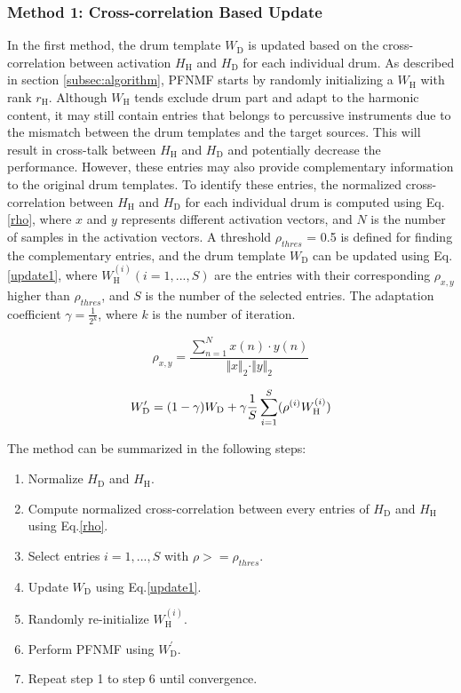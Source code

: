\documentclass{article}
\begin{document}
\subsubsection{Method 1: Cross-correlation Based Update}\label{subsubsec:method1}
In the first method, the drum template $W_\mathrm{D}$ is updated based on the cross-correlation between activation $H_\mathrm{H}$ and $H_\mathrm{D}$ for each individual drum. As described in section \ref{subsec:algorithm}, PFNMF starts by randomly initializing a $W_\mathrm{H}$ with rank $r_\mathrm{H}$. Although $W_\mathrm{H}$ tends exclude drum part and adapt to the harmonic content, it may still contain entries that belongs to percussive instruments due to the mismatch between the drum templates and the target sources. This will result in cross-talk between $H_\mathrm{H}$ and $H_\mathrm{D}$ and potentially decrease the performance. However, these entries may also provide complementary information to the original drum templates. To identify these entries, the normalized cross-correlation between $H_\mathrm{H}$ and $H_\mathrm{D}$ for each individual drum is computed using Eq.\eqref{rho}, where $x$ and $y$ represents different activation vectors, and $N$ is the number of samples in the activation vectors. A threshold $\rho_{thres}$ = 0.5 is defined for finding the complementary entries, and the drum template $W_\mathrm{D}$ can be updated using Eq.\eqref{update1}, where $W_\mathrm{H}^{(i)} (i = 1, ..., S)$ are the entries with their corresponding $\rho_{x, y}$ higher than $\rho_{thres}$, and $S$ is the number of the selected entries. The adaptation coefficient $\gamma = \frac{1}{2^{k}}$, where $k$ is the number of iteration. 

\begin{equation}\label{rho}
\rho_{x, y} = \frac{\sum_{n=1}^N x(n)\cdot y(n)}{\Vert x \Vert_2 \cdot \Vert y \Vert_2}
\end{equation}    

\begin{equation}
\label{update1}
W_\mathrm{D}^{\prime} = (1 - \gamma) W_\mathrm{D} + \gamma \frac{1}{S} \sum_{i=1}^S(\rho^{(i)} W_\mathrm{H}^{(i)})\\
\end{equation}

The method can be summarized in the following steps:
\begin{enumerate}
    \item   Normalize $H_\mathrm{D}$ and $H_\mathrm{H}$. 
    \item   Compute normalized cross-correlation between every entries of $H_\mathrm{D}$ and $H_\mathrm{H}$ using Eq.\eqref{rho}.
    \item   Select entries $i = 1, ..., S$ with $\rho >= \rho_{thres}$.
    \item   Update $W_\mathrm{D}$ using Eq.\eqref{update1}.
    \item   Randomly re-initialize $W_\mathrm{H}^{(i)}$. 
    \item   Perform PFNMF using $W_\mathrm{D}^{\prime}$.
    \item   Repeat step 1 to step 6 until convergence. 
\end{enumerate}
\end{document}
